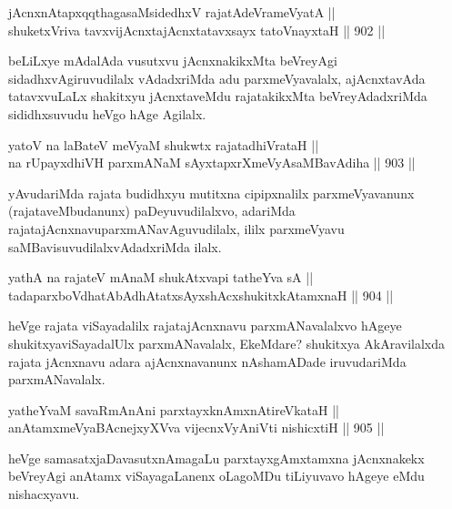 \begin{shl}
jAcnxnAtapxqqthagasaMsidedhxV rajatAdeVrameVyatA || \\
shuketxVriva tavxvijAcnxtajAcnxtatavxsayx tatoV\s nayxtaH \hfill || 902 ||  
\end{shl}

\begin{artha}
beLiLxye mAdalAda vusutxvu jAcnxnakikxMta beVreyAgi sidadhxvAgiruvudilalx vAdadxriMda adu parxmeVyavalalx, ajAcnxtavAda tatavxvuLaLx shakitxyu jAcnxtaveMdu rajatakikxMta beVreyAdadxriMda sididhxsuvudu heVgo hAge Agilalx.
\end{artha}

\begin{shl}
yatoV na laBateV meVyaM shukwtx rajatadhiVrataH || \\
na rUpayxdhiVH parxmANaM sAyxtapxrXmeVyAsaMBavAdiha \hfill || 903 ||  
\end{shl}

\begin{artha}
yAvudariMda rajata budidhxyu mutitxna cipipxnalilx parxmeVyavanunx (rajataveMbudanunx) paDeyuvudilalxvo, adariMda rajatajAcnxnavu\break parxmANavAguvudilalx, ililx parxmeVyavu saMBavisuvudilalxvAdadxriMda ilalx.
\end{artha}

\begin{shl}
yathA na rajateV mAnaM shukAtxvapi tatheYva sA || \\
tadaparxboVdhatAbAdhAtatxsAyxshAcxshukitxkAtamxnaH \hfill || 904 ||  
\end{shl}

\begin{artha}
heVge rajata viSayadalilx rajatajAcnxnavu parxmANavalalxvo hAgeye shukitxyaviSayadalUlx parxmANavalalx, EkeMdare? shukitxya AkAravilalxda rajata jAcnxnavu adara ajAcnxnavanunx nAshamADade iruvudariMda parxmANavalalx.
\end{artha}


\begin{shl}
yatheYvaM savaRmAnAni parxtayxknAmxnAtireVkataH || \\
anAtamxmeVyaBAcnejxyXVva vijecnxVyAniVti nishicxtiH \hfill || 905 ||  
\end{shl}

\begin{artha}
heVge samasatxjaDavasutxnAmagaLu parxtayxgAmxtamxna jAcnxnakekx beVreyAgi anAtamx viSayagaLanenx oLagoMDu tiLiyuvavo hAgeye eMdu nishacxyavu.
\end{artha}

